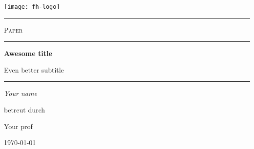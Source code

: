 \begin{titlepage}
    \texttt{[image: fh-logo]}\par
    \centering
    \vspace{0.2cm}
    {\color{fhdo}\hrule height 0.5pt\relax}
    \vspace{0.5cm}
    {\scshape Paper\par}
    \vfill
    {\color{fhdo}\rule{0.8\textwidth}{0.1pt}\par}
    \vspace{0.5cm}
    {\LARGE\bfseries Awesome title\par}
    \vspace{0.2cm}
    {\Large Even better subtitle\par}
    \vspace{0.5cm}
    {\color{fhdo}\rule{0.8\textwidth}{0.1pt}\par}
    \vspace{0.5cm}
    {\Large\emph{Your name}\par}
    \vfill
    betreut durch\par
    Your prof\par
    \vspace{2cm}
    {\today\par}
\end{titlepage}
\restoregeometry{}